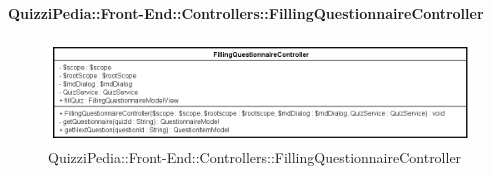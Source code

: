 \paragraph{QuizziPedia::Front-End::Controllers::FillingQuestionnaireController}
\begin{figure} [ht]
	\centering
	\includegraphics[scale=0.45]{UML/Classi/Front-End/QuizziPedia_Front-end_Controller_FillingQuestionnaireController.png}
	\caption{QuizziPedia::Front-End::Controllers::FillingQuestionnaireController}
\end{figure} \FloatBarrier
